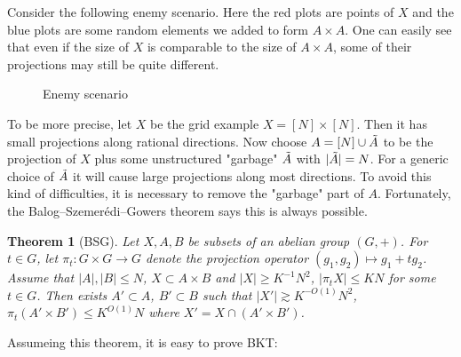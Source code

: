 \documentclass[12pt]{amsart}
\newtheorem{theorem}{Theorem}[section]
\begin{document}
Consider the following enemy scenario. Here the red plots are points of $X$ and the blue plots are some random elements we added to form $A \times A$. One can easily see that even if the size of $X$ is comparable to the size of $A \times A$, some of their projections may still be quite different.   
\begin{figure}[h]
\centering 

\caption{Enemy scenario} 
\label{fig:enemydiagram}
\end{figure}

To be more precise, let $X$ be the grid example $X = [N] \times [N]$. Then it has small projections along rational directions. Now choose $A = [N] \cup \Tilde{A}$ to be the projection of $X$ plus some unstructured "garbage" $\Tilde{A}$ with $|\Tilde{A}| = N$. For a generic choice of $\Tilde{A}$ it will cause large projections along most directions. To avoid this kind of difficulties, it is necessary to remove the "garbage" part of $A$. Fortunately, the Balog–Szemer\'edi–Gowers theorem says this is always possible.

\begin{theorem}[BSG]
     Let $X,A,B$ be subsets of an abelian group $(G,+)$. For $t \in G$, let $\pi_t: G \times G \to G$ denote the projection operator $(g_1, g_2) \mapsto g_1 + t g_2$. Assume that $|A|, |B| \le N$, $X \subset A \times B$ and $|X| \ge K^{-1} N^2$, $|\pi_t X| \le KN$ for some $t \in G$. Then exists $A' \subset A$, $B' \subset B$ such that $|X'| \gtrsim  K^{-O(1)}N^2$, $\pi_t(A' \times B') \le K^{O(1)}N$ where $X' = X \cap (A' \times B')$.
\end{theorem}

Assumeing this theorem, it is easy to prove BKT:
\end{document}
